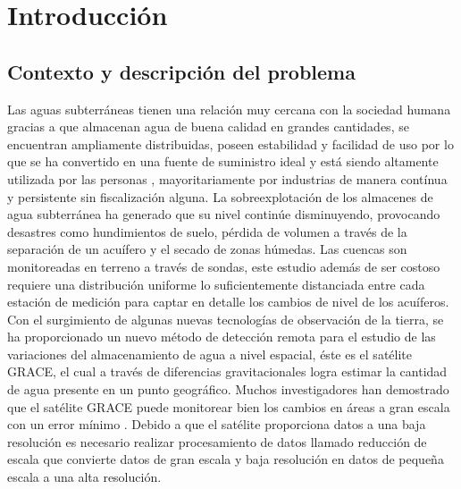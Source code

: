 \chapter{Introducción}

\section{Contexto y descripción del problema}
Las aguas subterráneas tienen una relación muy cercana con la sociedad humana gracias a que almacenan 
agua de buena calidad en grandes cantidades, se encuentran ampliamente distribuidas, poseen estabilidad 
y facilidad de uso por lo que se ha convertido en una fuente de suministro ideal y está siendo altamente 
utilizada por las personas \cite{11}, mayoritariamente por industrias de manera contínua y persistente sin 
fiscalización alguna. La sobreexplotación de los almacenes de agua subterránea ha generado que su nivel 
continúe disminuyendo, provocando desastres como hundimientos de suelo, pérdida de volumen a través de la
separación de un acuífero y el secado de zonas húmedas.
Las cuencas son monitoreadas en terreno a través de sondas, este estudio además de ser costoso requiere 
una distribución uniforme lo suficientemente distanciada entre cada estación de medición para captar en
detalle los cambios de nivel de los acuíferos. 
Con el surgimiento de algunas nuevas tecnologías de observación de la tierra, 
se ha proporcionado un nuevo método de detección remota para el estudio de las variaciones 
del almacenamiento de agua a nivel espacial, éste es el satélite GRACE, el cual a través de 
diferencias gravitacionales logra estimar la cantidad de agua presente en un punto geográfico. 
Muchos investigadores han demostrado que el satélite GRACE puede monitorear bien los cambios en áreas 
a gran escala con un error mínimo \cite{11}. Debido a que el satélite proporciona datos a una baja resolución es 
necesario realizar procesamiento de datos llamado reducción de escala que convierte datos de gran escala
y baja resolución en datos de pequeña escala a una alta resolución. 
%
%
%
%
